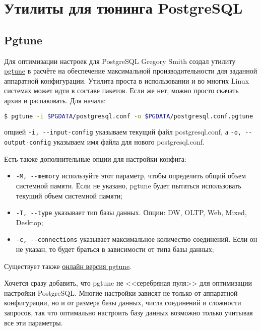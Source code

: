 \section{Утилиты для тюнинга PostgreSQL}

\subsection{Pgtune}

Для оптимизации настроек для PostgreSQL Gregory Smith создал утилиту \href{http://pgtune.projects.postgresql.org/}{pgtune} в расчёте на обеспечение максимальной производительности для заданной аппаратной конфигурации. Утилита проста в использовании и во многих Linux системах может идти в составе пакетов. Если же нет, можно просто скачать архив и распаковать. Для начала:

\begin{lstlisting}[language=Bash,label=lst:pgtune_settings1,caption=Pgtune]
$ pgtune -i $PGDATA/postgresql.conf -o $PGDATA/postgresql.conf.pgtune
\end{lstlisting}

опцией \lstinline!-i, --input-config! указываем текущий файл postgresql.conf, а \lstinline!-o, --output-config! указываем имя файла для нового postgresql.conf.

Есть также дополнительные опции для настройки конфига:

\begin{itemize}
  \item \lstinline!-M, --memory! используйте этот параметр, чтобы определить общий объем системной памяти. Если не указано, pgtune будет пытаться использовать текущий объем системной памяти;
  \item \lstinline!-T, --type! указывает тип базы данных. Опции: DW, OLTP, Web, Mixed, Desktop;
  \item \lstinline!-c, --connections! указывает максимальное количество соединений. Если он не указан, то будет браться в зависимости от типа базы данных;
\end{itemize}

Существует также \href{http://pgtune.leopard.in.ua/}{онлайн версия pgtune}.

Хочется сразу добавить, что pgtune не <<серебряная пуля>> для оптимизации настройки PostgreSQL. Многие настройки зависят не только от аппаратной конфигурации, но и от размера базы данных, числа соединений и сложности запросов, так что оптимально настроить базу данных возможно только учитывая все эти параметры.


